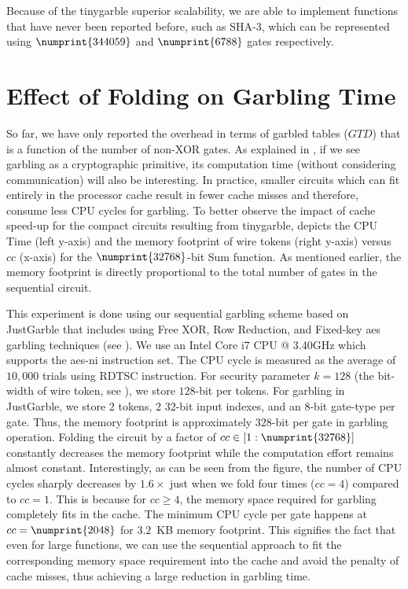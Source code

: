 Because of the \gls{tinygarble} superior scalability, we are able to implement functions that have never been reported before, such as SHA-3, which can be represented using $\numprint{344059}$ and $\numprint{6788}$ gates respectively.

\section{Effect of Folding on Garbling Time}
So far, we have only reported the overhead in terms of garbled tables ($\mathit{GTD}$) that is a function of the number of non-XOR gates.
As explained in \cite{bellare2013efficient}, if we see garbling as a cryptographic primitive, its computation time (without considering communication) will also be interesting.
In practice, smaller circuits which can fit entirely in the processor cache result in fewer cache misses and therefore, consume less CPU cycles for garbling.
To better observe the impact of cache speed-up for the compact circuits resulting from \gls{tinygarble},  depicts the CPU Time (left y-axis) and the memory footprint of wire tokens (right y-axis) versus $cc$ (x-axis) for the $\numprint{32768}$-bit Sum function.
As mentioned earlier, the memory footprint is directly proportional to the total number of gates in the sequential circuit.

This experiment is done using our sequential garbling scheme based on JustGarble \cite{bellare2013efficient} that includes using Free XOR, Row Reduction, and Fixed-key \acrshort{aes} garbling techniques (see ).
We use an Intel Core i7 CPU @ 3.40GHz which supports the \acrshort{aes-ni} instruction set.
The CPU cycle is measured as the average of $10,000$ trials using RDTSC instruction.
For security parameter $k=128$ (the bit-width of wire token, see ), we store $128$-bit per tokens.
For garbling in JustGarble, we store 2 tokens, 2 32-bit input indexes, and an 8-bit gate-type per gate.
Thus, the memory footprint is approximately $328$-bit per gate in garbling operation.
Folding the circuit by a factor of $cc \in [1:\numprint{32768}]$ constantly decreases the memory footprint while the computation effort remains almost constant.
Interestingly, as can be seen from the figure, the number of CPU cycles sharply decreases by $1.6\times$ just when we fold four times ($cc=4$) compared to $cc=1$.
This is because for $cc \geq 4$, the memory space required for garbling completely fits in the cache.
The minimum CPU cycle per gate happens at $cc=\numprint{2048}$ for $3.2$~KB memory footprint.
This signifies the fact that even for large functions, we can use the sequential approach to fit the corresponding memory space requirement into the cache and avoid the penalty of cache misses, thus achieving a large reduction in garbling time.

